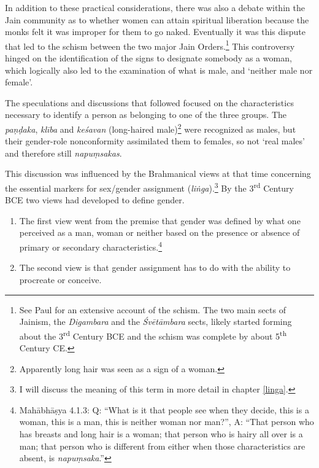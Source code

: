 In addition to these practical considerations, there was also a debate within the Jain community as to whether women can attain spiritual liberation because the monks felt it was improper for them to go naked. Eventually it was this dispute that led to the schism between the two major Jain Orders.\footnote{See Paul \cite{dudas} for an extensive account of the schism. The two main sects of Jainism, the {\em Digambara} and the {\em Śvētāmbara} sects, likely started forming about the 3\textsuperscript{rd} Century BCE and the schism was complete by about 5\textsuperscript{th} Century CE.} This controversy hinged on the identification of the signs to designate somebody as a woman, which logically also led to the examination of what is male, and `neither male nor female'. 

The speculations and discussions that followed focused on the characteristics necessary to identify a person as belonging to one of the three groups. The {\em paṇḍaka}, {\em klība} and {\em keśavan} (long-haired male)\footnote{Apparently long hair was seen as a sign of a woman.} were recognized as males, but their gender-role nonconformity assimilated them to females, so not `real males' and therefore still {\em napuṃsakas}.

This discussion was influenced by the Brahmanical views at that time concerning the essential markers for sex/gender assignment ({\em liṅga}).\footnote{I will discuss the meaning of this term in more detail in chapter \ref{linga}.} By the 3\textsuperscript{rd} Century BCE two views had developed to define gender.

\begin{enumerate}
 \item The first view went from the premise that gender was defined by what one perceived as a man, woman or neither based on the presence or absence of primary or secondary characteristics.\footnote{Mahābhāṣya 4.1.3: Q: ``What is it that people see when they decide, this is a woman, this is a man, this is neither woman nor man?'', A: ``That person who has breasts and long hair is a woman; that person who is hairy all over is a man; that person who is different from either when those characteristics are absent, is {\em napuṃsaka}.''}
 \item The second view is that gender assignment has to do with the ability to procreate or conceive. 
\end{enumerate}

